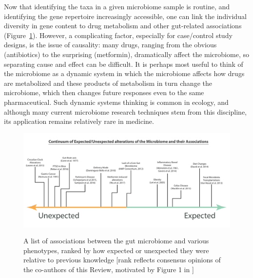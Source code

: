Now that identifying the taxa in a given microbiome sample is routine, and identifying the gene repertoire increasingly accessible, one can link the individual diversity in gene content to drug metabolism and other gut-related associations (Figure~\ref{review_fig1}). However, a complicating factor, especially for case/control study designs, is the issue of causality: many drugs, ranging from the obvious (antibiotics) to the surprising (metformin), dramatically affect the microbiome, so separating cause and effect can be difficult. It is perhaps most useful to think of the microbiome as a dynamic system in which the microbiome affects how drugs are metabolized and these products of metabolism in turn change the microbiome, which then changes future responses even to the same pharmaceutical. Such dynamic systems thinking is common in ecology, and although many current microbiome research techniques stem from this discipline, its application remains relatively rare in medicine.

\begin{figure}
\includegraphics[width=0.95\textheight]{review-figures/figure-1}
\label{review_fig1}
\caption[A list of associations between the gut microbiome and various phenotypes]{A list of associations between the gut microbiome and various phenotypes, ranked by how expected or unexpected they were relative to previous knowledge [rank reflects consensus opinions of the co-authors of this Review, motivated by Figure 1 in \cite{RN4058}]}
\end{figure}


